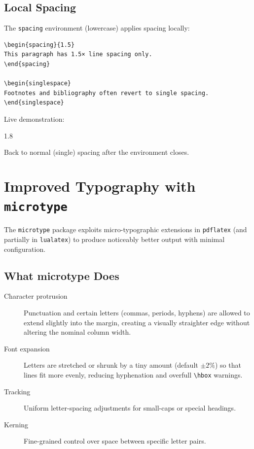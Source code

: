 \documentclass[12pt,a4paper,twoside]{article}
\begin{document}
\subsection{Local Spacing}

The \texttt{spacing} environment (lowercase) applies spacing locally:

\begin{verbatim}
\begin{spacing}{1.5}
This paragraph has 1.5× line spacing only.
\end{spacing}

\begin{singlespace}
Footnotes and bibliography often revert to single spacing.
\end{singlespace}
\end{verbatim}

\noindent Live demonstration:

\begin{spacing}{1.8}
\lipsum[6]
\end{spacing}

Back to normal (single) spacing after the environment closes.

\lipsum[7]


\section{Improved Typography with \texttt{microtype}}
\label{sec:microtype}

The \texttt{microtype} package exploits micro-typographic extensions in
\texttt{pdflatex} (and partially in \texttt{lualatex}) to produce
noticeably better output with minimal configuration.

\subsection{What microtype Does}

\begin{description}
    \item[Character protrusion]
        Punctuation and certain letters (commas, periods, hyphens) are allowed
        to extend slightly into the margin, creating a visually straighter edge
        without altering the nominal column width.

    \item[Font expansion]
        Letters are stretched or shrunk by a tiny amount (default $\pm 2\%$)
        so that lines fit more evenly, reducing hyphenation and overfull
        \verb|\hbox| warnings.

    \item[Tracking]
        Uniform letter-spacing adjustments for small-caps or special headings.

    \item[Kerning]
        Fine-grained control over space between specific letter pairs.
\end{description}
\end{document}
